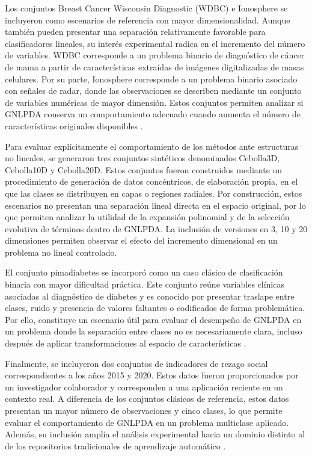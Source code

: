 Los conjuntos Breast Cancer Wisconsin Diagnostic (WDBC) e Ionosphere se incluyeron como escenarios de referencia con mayor dimensionalidad. Aunque también pueden presentar una separación relativamente favorable para clasificadores lineales, su interés experimental radica en el incremento del número de variables. WDBC corresponde a un problema binario de diagnóstico de cáncer de mama a partir de características extraídas de imágenes digitalizadas de masas celulares. Por su parte, Ionosphere corresponde a un problema binario asociado con señales de radar, donde las observaciones se describen mediante un conjunto de variables numéricas de mayor dimensión. Estos conjuntos permiten analizar si GNLPDA conserva un comportamiento adecuado cuando aumenta el número de características originales disponibles \cite{salama2012breast} \cite{sigillito1989classification}.

Para evaluar explícitamente el comportamiento de los métodos ante estructuras no lineales, se generaron tres conjuntos sintéticos denominados Cebolla3D, Cebolla10D y Cebolla20D. Estos conjuntos fueron construidos mediante un procedimiento de generación de datos concéntricos, de elaboración propia, en el que las clases se distribuyen en capas o regiones radiales. Por construcción, estos escenarios no presentan una separación lineal directa en el espacio original, por lo que permiten analizar la utilidad de la expansión polinomial y de la selección evolutiva de términos dentro de GNLPDA. La inclusión de versiones en 3, 10 y 20 dimensiones permiten observar el efecto del incremento dimensional en un problema no
lineal controlado.

El conjunto pimadiabetes se incorporó como un caso clásico de clasificación binaria con mayor dificultad práctica. Este conjunto reúne variables clínicas asociadas al diagnóstico de diabetes y es conocido por presentar traslape entre clases, ruido y presencia de valores faltantes o codificados de forma problemática. Por ello, constituye un escenario útil para evaluar el desempeño de GNLPDA en un problema donde la separación entre clases no es necesariamente clara, incluso después de aplicar transformaciones al espacio de características \cite{smith1988using}.

Finalmente, se incluyeron dos conjuntos de indicadores de rezago social correspondientes a los años 2015 y 2020. Estos datos fueron proporcionados por un investigador colaborador y corresponden a una aplicación reciente en un contexto real. A diferencia de los conjuntos clásicos de referencia, estos datos presentan un mayor número de observaciones y cinco clases, lo que permite evaluar el comportamiento de GNLPDA en un problema multiclase aplicado. Además, su inclusión amplía el análisis experimental hacia un dominio distinto al de los repositorios tradicionales de aprendizaje automático \cite{navarro2025bayesian}.

